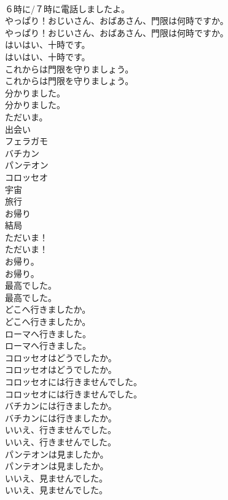 \documentclass[8pt]{extreport}
\begin{document}
\begin{CJK}{UTF8}{min}
\\	６時に/７時に電話しましたよ。 
\\	やっぱり！おじいさん、おばあさん、門限は何時ですか。	
\\	やっぱり！おじいさん、おばあさん、門限は何時ですか。 
\\	はいはい、十時です。	
\\	はいはい、十時です。 
\\	これからは門限を守りましょう。	
\\	これからは門限を守りましょう。 
\\	分かりました。	
\\	分かりました。 
\\	ただいま。
\\	出会い
\\	フェラガモ
\\	バチカン
\\	パンテオン
\\	コロッセオ
\\	宇宙
\\	旅行
\\	お帰り
\\	結局
\\	ただいま！	
\\	ただいま！ 
\\	お帰り。	
\\	お帰り。 
\\	最高でした。	
\\	最高でした。 
\\	どこへ行きましたか。	
\\	どこへ行きましたか。 
\\	ローマへ行きました。	
\\	ローマへ行きました。 
\\	コロッセオはどうでしたか。	
\\	コロッセオはどうでしたか。 
\\	コロッセオには行きませんでした。	
\\	コロッセオには行きませんでした。 
\\	バチカンには行きましたか。	
\\	バチカンには行きましたか。 
\\	いいえ、行きませんでした。	
\\	いいえ、行きませんでした。 
\\	パンテオンは見ましたか。	
\\	パンテオンは見ましたか。 
\\	いいえ、見ませんでした。	
\\	いいえ、見ませんでした。 

\end{CJK}
\end{document}
